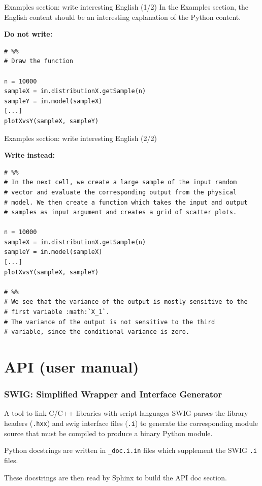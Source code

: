 \documentclass[8pt]{beamer}
\begin{document}
\begin{frame}[fragile]{Examples section: write interesting English (1/2)}
In the Examples section, the English content should be an interesting explanation
of the Python content. \medskip

\textbf{Do not write:}


\lstset{style=mystyle, language=python}

\begin{lstlisting}
# %%
# Draw the function

n = 10000
sampleX = im.distributionX.getSample(n)
sampleY = im.model(sampleX)
[...]
plotXvsY(sampleX, sampleY)
\end{lstlisting}

\end{frame}


\begin{frame}[fragile]{Examples section: write interesting English (2/2)}
\lstset{style=mystyle, language=python}

\textbf{Write instead:}

\begin{lstlisting}
# %%
# In the next cell, we create a large sample of the input random
# vector and evaluate the corresponding output from the physical
# model. We then create a function which takes the input and output
# samples as input argument and creates a grid of scatter plots.

n = 10000
sampleX = im.distributionX.getSample(n)
sampleY = im.model(sampleX)
[...]
plotXvsY(sampleX, sampleY)

# %%
# We see that the variance of the output is mostly sensitive to the
# first variable :math:`X_1`.
# The variance of the output is not sensitive to the third
# variable, since the conditional variance is zero.
\end{lstlisting}
\end{frame}

\section{API (user manual)}



\begin{frame}
\frametitle{SWIG: Simplified Wrapper and Interface Generator}
\begin{block}{A tool to link C/C++ libraries with script languages}
    SWIG parses the library headers (\texttt{.hxx}) and swig interface files (\texttt{.i}) to
    generate the corresponding module source that must be compiled to
    produce a binary Python module.
\end{block}
\centering {} \medskip

Python \alert{docstrings} are written in \texttt{\_doc.i.in} files which supplement the \alert{SWIG} \texttt{.i} files.

These docstrings are then read by \alert{Sphinx} to build the API doc section.
\end{frame}
\end{document}
